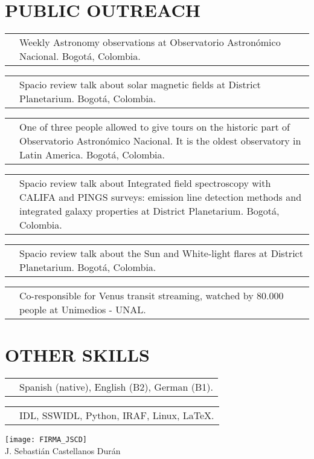 \documentclass[11pt,a4paper,sans]{moderncv}        %
\makeatletter
\renewcommand*{\cvitem}[3][.25em]{%
  \begin{tabular}{@{}p{\hintscolumnwidth}@{\hspace{\separatorcolumnwidth}}p{\maincolumnwidth}@{}}%
      \raggedleft\hintstyle{#2} &{#3}%
  \end{tabular}%
  \par\addvspace{#1}}
\makeatother
\begin{document}
\section{PUBLIC OUTREACH}
\cvitem{2011-present}{Weekly Astronomy observations at Observatorio Astronómico Nacional.  Bogotá, Colombia.}
\cvitem{5/2015}{Spacio review talk about solar magnetic fields at District Planetarium. Bogotá, Colombia.}
\cvitem{2012-present}{One of three people allowed to give tours on the historic part of Observatorio Astronómico Nacional. It is the oldest observatory in Latin America. Bogotá, Colombia.}
\cvitem{10/2014}{Spacio review talk about Integrated field spectroscopy with CALIFA and PINGS surveys: emission line detection methods and integrated galaxy properties at District Planetarium. Bogotá, Colombia.}
\cvitem{4/2014}{Spacio review talk about the Sun and White-light flares at District Planetarium. Bogotá, Colombia.}
\cvitem{6/2012}{Co-responsible for Venus transit streaming, watched by 80.000 people at Unimedios - UNAL.}

\medskip
\section{OTHER SKILLS}
\cvitem{Languages:}{Spanish (native), English (B2), German (B1).}
\cvitem{Computer skills:}{ IDL, SSWIDL, Python, IRAF, Linux, \LaTeX.}

\bigskip
\bigskip
\bigskip
\bigskip
\bigskip
\bigskip
\bigskip
\bigskip
\bigskip
\bigskip
\bigskip
\texttt{[image: FIRMA\_JSCD]}\\
{\Large J. Sebastián Castellanos Durán}
\end{document}
